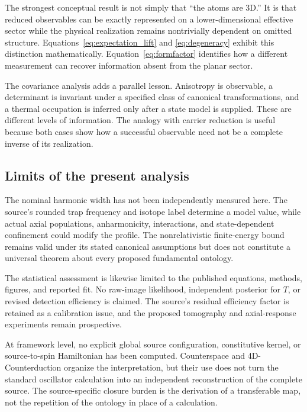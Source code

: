 \documentclass[11pt,a4paper]{article}
\theoremstyle{definition}
\theoremstyle{remark}
\begin{document}
The strongest conceptual result is not simply that ``the atoms are 3D.'' It is that reduced observables can be exactly represented on a lower-dimensional effective sector while the physical realization remains nontrivially dependent on omitted structure. Equations~\eqref{eq:expectation_lift} and \eqref{eq:degeneracy} exhibit this distinction mathematically. Equation~\eqref{eq:formfactor} identifies how a different measurement can recover information absent from the planar sector.

The covariance analysis adds a parallel lesson. Anisotropy is observable, a determinant is invariant under a specified class of canonical transformations, and a thermal occupation is inferred only after a state model is supplied. These are different levels of information. The analogy with carrier reduction is useful because both cases show how a successful observable need not be a complete inverse of its realization.

\subsection{Limits of the present analysis}
The nominal harmonic width has not been independently measured here. The source's rounded trap frequency and isotope label determine a model value, while actual axial populations, anharmonicity, interactions, and state-dependent confinement could modify the profile. The nonrelativistic finite-energy bound remains valid under its stated canonical assumptions but does not constitute a universal theorem about every proposed fundamental ontology.

The statistical assessment is likewise limited to the published equations, methods, figures, and reported fit. No raw-image likelihood, independent posterior for $T$, or revised detection efficiency is claimed. The source's residual efficiency factor is retained as a calibration issue, and the proposed tomography and axial-response experiments remain prospective.\cite{zhang2026}

At framework level, no explicit global source configuration, constitutive kernel, or source-to-spin Hamiltonian has been computed. Counterspace and 4D-Counterduction organize the interpretation, but their use does not turn the standard oscillator calculation into an independent reconstruction of the complete source. The source-specific closure burden is the derivation of a transferable map, not the repetition of the ontology in place of a calculation.\cite{foundation,planck}
\end{document}
